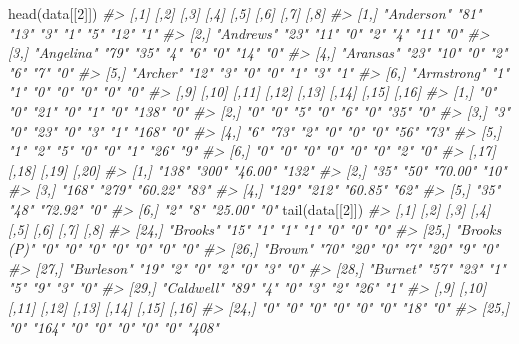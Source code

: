 \documentclass[
  12pt,
  openany]{book}
\newenvironment{Shaded}{\begin{snugshade}}{\end{snugshade}}
\newcommand{\CommentTok}[1]{\textcolor[rgb]{0.37,0.37,0.37}{\textit{#1}}}
\newcommand{\DecValTok}[1]{\textcolor[rgb]{0.06,0.06,0.06}{#1}}
\newcommand{\FunctionTok}[1]{\textcolor[rgb]{0,0,0}{#1}}
\newcommand{\NormalTok}[1]{#1}
\begin{document}
\begin{Shaded}
\begin{Highlighting}[]
\FunctionTok{head}\NormalTok{(data[[}\DecValTok{2}\NormalTok{]])}
\CommentTok{\#\textgreater{}      [,1]        [,2] [,3] [,4] [,5] [,6] [,7] [,8]}
\CommentTok{\#\textgreater{} [1,] "Anderson"  "81" "13" "3"  "1"  "5"  "12" "1" }
\CommentTok{\#\textgreater{} [2,] "Andrews"   "23" "11" "0"  "2"  "4"  "11" "0" }
\CommentTok{\#\textgreater{} [3,] "Angelina"  "79" "35" "4"  "6"  "0"  "14" "0" }
\CommentTok{\#\textgreater{} [4,] "Aransas"   "23" "10" "0"  "2"  "6"  "7"  "0" }
\CommentTok{\#\textgreater{} [5,] "Archer"    "12" "3"  "0"  "0"  "1"  "3"  "1" }
\CommentTok{\#\textgreater{} [6,] "Armstrong" "1"  "1"  "0"  "0"  "0"  "0"  "0" }
\CommentTok{\#\textgreater{}      [,9] [,10] [,11] [,12] [,13] [,14] [,15] [,16]}
\CommentTok{\#\textgreater{} [1,] "0"  "0"   "21"  "0"   "1"   "0"   "138" "0"  }
\CommentTok{\#\textgreater{} [2,] "0"  "0"   "5"   "0"   "6"   "0"   "35"  "0"  }
\CommentTok{\#\textgreater{} [3,] "3"  "0"   "23"  "0"   "3"   "1"   "168" "0"  }
\CommentTok{\#\textgreater{} [4,] "6"  "73"  "2"   "0"   "0"   "0"   "56"  "73" }
\CommentTok{\#\textgreater{} [5,] "1"  "2"   "5"   "0"   "0"   "1"   "26"  "9"  }
\CommentTok{\#\textgreater{} [6,] "0"  "0"   "0"   "0"   "0"   "0"   "2"   "0"  }
\CommentTok{\#\textgreater{}      [,17] [,18] [,19]   [,20]}
\CommentTok{\#\textgreater{} [1,] "138" "300" "46.00" "132"}
\CommentTok{\#\textgreater{} [2,] "35"  "50"  "70.00" "10" }
\CommentTok{\#\textgreater{} [3,] "168" "279" "60.22" "83" }
\CommentTok{\#\textgreater{} [4,] "129" "212" "60.85" "62" }
\CommentTok{\#\textgreater{} [5,] "35"  "48"  "72.92" "0"  }
\CommentTok{\#\textgreater{} [6,] "2"   "8"   "25.00" "0"}
\FunctionTok{tail}\NormalTok{(data[[}\DecValTok{2}\NormalTok{]])}
\CommentTok{\#\textgreater{}       [,1]         [,2] [,3] [,4] [,5] [,6] [,7] [,8]}
\CommentTok{\#\textgreater{} [24,] "Brooks"     "15" "1"  "1"  "1"  "0"  "0"  "0" }
\CommentTok{\#\textgreater{} [25,] "Brooks (P)" "0"  "0"  "0"  "0"  "0"  "0"  "0" }
\CommentTok{\#\textgreater{} [26,] "Brown"      "70" "20" "0"  "7"  "20" "9"  "0" }
\CommentTok{\#\textgreater{} [27,] "Burleson"   "19" "2"  "0"  "2"  "0"  "3"  "0" }
\CommentTok{\#\textgreater{} [28,] "Burnet"     "57" "23" "1"  "5"  "9"  "3"  "0" }
\CommentTok{\#\textgreater{} [29,] "Caldwell"   "89" "4"  "0"  "3"  "2"  "26" "1" }
\CommentTok{\#\textgreater{}       [,9] [,10] [,11] [,12] [,13] [,14] [,15] [,16]}
\CommentTok{\#\textgreater{} [24,] "0"  "0"   "0"   "0"   "0"   "0"   "18"  "0"  }
\CommentTok{\#\textgreater{} [25,] "0"  "164" "0"   "0"   "0"   "0"   "0"   "408"}

\end{Highlighting}
\end{Shaded}
\end{document}
